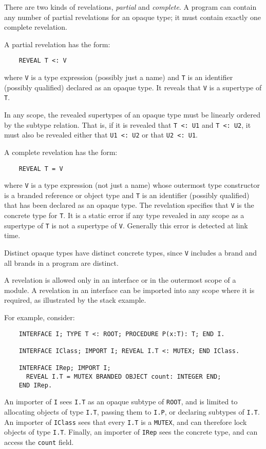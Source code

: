 \documentclass[10pt]{article}
\begin{document}
There are two kinds of revelations, \emph{partial} and \emph{complete}.  A
program can contain any number of partial revelations for an opaque type; it
must contain exactly one complete revelation.

A partial revelation has the form:
\begin{verbatim}
    REVEAL T <: V
\end{verbatim}
where \verb|V| is a type expression (possibly just a name) and \verb|T| is an
identifier (possibly qualified) declared as an opaque type.  It reveals that
\verb|V| is a supertype of \verb|T|.

In any scope, the revealed supertypes of an opaque type must be linearly
ordered by the subtype relation.  That is, if it is revealed that
\verb|T <: U1| and \verb|T <: U2|, it must also be revealed either that
\verb|U1 <: U2| or that \verb|U2 <: U1|.

A complete revelation has the form:
\begin{verbatim}
    REVEAL T = V
\end{verbatim}
where \verb|V| is a type expression (not just a name) whose outermost type
constructor is a branded reference or object type and \verb|T| is an
identifier (possibly qualified) that has been declared as an opaque type.  The
revelation specifies that \verb|V| is the concrete type for \verb|T|.  It is a
static error if any type revealed in any scope as a supertype of \verb|T| is
not a supertype of \verb|V|.  Generally this error is detected at link time.

Distinct opaque types have distinct concrete types, since \verb|V| includes a
brand and all brands in a program are distinct.

A revelation is allowed only in an interface or in the outermost scope of a
module.  A revelation in an interface can be imported into any scope where it
is required, as illustrated by the stack example.

For example, consider:
\begin{verbatim}
    INTERFACE I; TYPE T <: ROOT; PROCEDURE P(x:T): T; END I.

    INTERFACE IClass; IMPORT I; REVEAL I.T <: MUTEX; END IClass.

    INTERFACE IRep; IMPORT I;
      REVEAL I.T = MUTEX BRANDED OBJECT count: INTEGER END;
    END IRep.
\end{verbatim}
An importer of \verb|I| sees \verb|I.T| as an opaque subtype of \verb|ROOT|,
and is limited to allocating objects of type \verb|I.T|, passing them to
\verb|I.P|, or declaring subtypes of \verb|I.T|.  An importer of \verb|IClass|
sees that every \verb|I.T| is a \verb|MUTEX|, and can therefore lock objects
of type \verb|I.T|.  Finally, an importer of \verb|IRep| sees the concrete
type, and can access the \verb|count| field.
\end{document}
